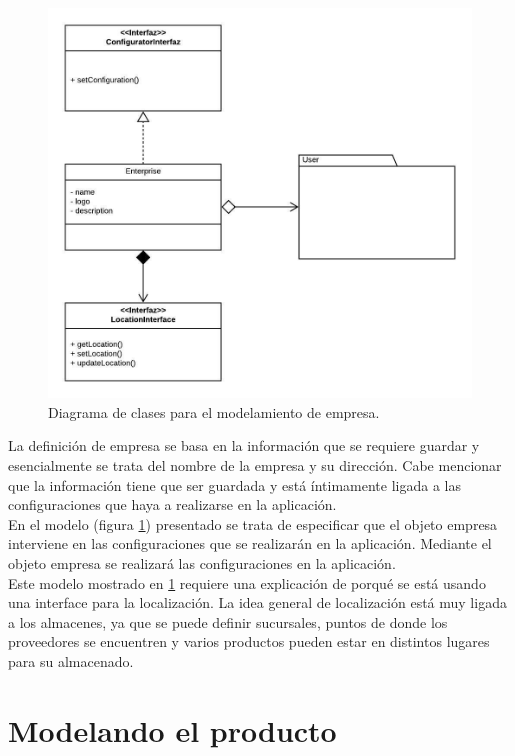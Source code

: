 \begin{figure}
  \centering
    \includegraphics[scale=0.9]{./Capitulo3/figs/ADDStock-enterprise.jpeg}
  \caption{Diagrama de clases para el modelamiento de empresa.}
  \label{enterprise}
\end{figure}

La definición de empresa se basa en la información que se requiere guardar y esencialmente se trata del nombre de la empresa y su dirección. Cabe mencionar que la información tiene que ser guardada y está íntimamente ligada a las configuraciones que haya a realizarse en la aplicación.\\

En el modelo (figura \ref{enterprise}) presentado se trata de especificar que el objeto empresa interviene en las configuraciones que se realizarán en la aplicación. Mediante el objeto empresa se realizará las configuraciones en la aplicación.\\

Este modelo mostrado en \ref{enterprise} requiere una explicación de porqué se está usando una interface para la localización. La idea general de localización está muy ligada a los almacenes, ya que se puede definir sucursales, puntos de donde los proveedores se encuentren y varios productos pueden estar en distintos lugares para su almacenado.



\section{Modelando el producto}

